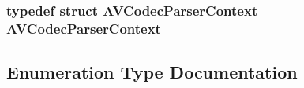 \subsubsection[{\texorpdfstring{A\+V\+Codec\+Parser\+Context}{AVCodecParserContext}}]{\setlength{\rightskip}{0pt plus 5cm}typedef struct {\bf A\+V\+Codec\+Parser\+Context}  {\bf A\+V\+Codec\+Parser\+Context}}\hypertarget{group__lavc__parsing_gab6849a20c5d551be1f9e5edb5b744e7b}{}\label{group__lavc__parsing_gab6849a20c5d551be1f9e5edb5b744e7b}


\subsection{Enumeration Type Documentation}
